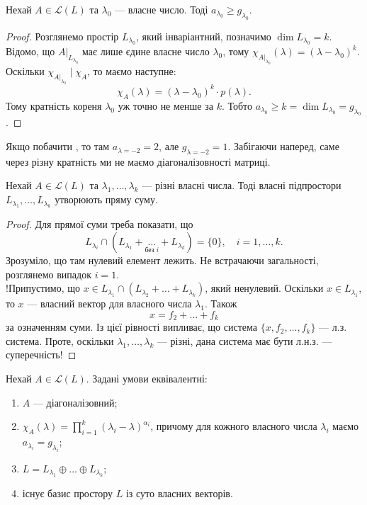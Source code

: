 \documentclass{math_library}
\begin{document}
\begin{corollary}
Нехай $A \in \mathcal{L}(L)$ та $\lambda_0$ --- власне число. Тоді $a_{\lambda_0} \geq g_{\lambda_0}$.
\end{corollary}

\begin{proof}
Розглянемо простір $L_{\lambda_0}$, який інваріантний, позначимо $\dim L_{\lambda_0} = k$. Відомо, що $A|_{L_{\lambda_0}}$ має лише єдине власне число $\lambda_0$, тому $\chi_{A|_{\lambda_0}}(\lambda) = (\lambda-\lambda_0)^k$. Оскільки $\chi_{A|_{\lambda_0}} \mid \chi_A$, то маємо наступне:
\[
\chi_A(\lambda) = (\lambda-\lambda_0)^k \cdot p(\lambda).
\]
Тому кратність кореня $\lambda_0$ уж точно не менше за $k$. Тобто $a_{\lambda_0} \geq k = \dim L_{\lambda_0} = g_{\lambda_0}$.
\end{proof}

\begin{example}
Якщо побачити , то там $a_{\lambda=-2} = 2$, але $g_{\lambda = -2} = 1$. Забігаючи наперед, саме через різну кратність ми не маємо діагоналізовності матриці.
\end{example}

\begin{proposition}
Нехай $A \in \mathcal{L}(L)$ та $\lambda_1,\dots,\lambda_k$ --- різні власні числа. Тоді власні підпростори $L_{\lambda_1},\dots, L_{\lambda_k}$ утворюють пряму суму.
\end{proposition}

\begin{proof}
Для прямої суми треба показати, що 
\[
L_{\lambda_i} \cap \left( L_{\lambda_1} + \underset{\text{без }i}{\dots} + L_{\lambda_k} \right) = \{0\}, \quad i = 1,\dots,k.
\]
Зрозуміло, що там нулевий елемент лежить. Не встрачаючи загальності, розглянемо випадок $i = 1$.\\
!Припустимо, що $x \in L_{\lambda_1} \cap (L_{\lambda_2} + \dots + L_{\lambda_k})$, який ненулевий. Оскільки $x \in L_{\lambda_1}$, то $x$ --- власний вектор для власного числа $\lambda_1$. Також 
\[
x = f_2 + \dots + f_k
\]
за означенням суми. Із цієї рівності випливає, що система $\{x,f_2,\dots,f_k\}$ --- л.з. система. Проте, оскільки $\lambda_1,\dots,\lambda_k$ --- різні, дана система має бути л.н.з. --- суперечність!
\end{proof}

\begin{theorem}
Нехай $A \in \mathcal{L}(L)$. Задані умови еквівалентні:
\begin{enumerate}[nosep,wide=0pt,label={\arabic*)}]
\item $A$ --- діагоналізовний;
\item $\chi_A(\lambda) = \displaystyle\prod_{i=1}^k (\lambda_i - \lambda)^{\alpha_i}$, причому для кожного власного числа $\lambda_i$ маємо $a_{\lambda_i} = g_{\lambda_i}$;
\item $L = L_{\lambda_1} \oplus \dots \oplus L_{\lambda_k}$;
\item існує базис простору $L$ із суто власних векторів.
\end{enumerate}
\end{theorem}
\end{document}
